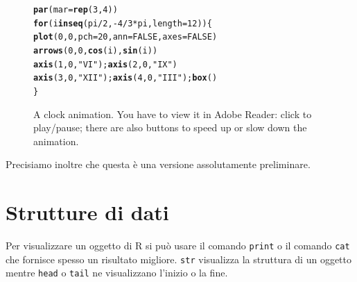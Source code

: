 \documentclass[onecolumn,12pt]{book}\usepackage[]{graphicx}\usepackage[]{color}
\makeatletter
\newcommand{\hlnum}[1]{\textcolor[rgb]{0.686,0.059,0.569}{#1}}%
\newcommand{\hlstr}[1]{\textcolor[rgb]{0.192,0.494,0.8}{#1}}%
\newcommand{\hlopt}[1]{\textcolor[rgb]{0,0,0}{#1}}%
\newcommand{\hlstd}[1]{\textcolor[rgb]{0.345,0.345,0.345}{#1}}%
\newcommand{\hlkwa}[1]{\textcolor[rgb]{0.161,0.373,0.58}{\textbf{#1}}}%
\newcommand{\hlkwc}[1]{\textcolor[rgb]{0.333,0.667,0.333}{#1}}%
\newcommand{\hlkwd}[1]{\textcolor[rgb]{0.737,0.353,0.396}{\textbf{#1}}}%
\newenvironment{kframe}{%
 \def\at@end@of@kframe{}%
 \ifinner\ifhmode%
  \def\at@end@of@kframe{\end{minipage}}%
  \begin{minipage}{\columnwidth}%
 \fi\fi%
 \def\FrameCommand##1{\hskip\@totalleftmargin \hskip-\fboxsep
 \colorbox{shadecolor}{##1}\hskip-\fboxsep
     \hskip-\linewidth \hskip-\@totalleftmargin \hskip\columnwidth}%
 \MakeFramed {\advance\hsize-\width
   \@totalleftmargin\z@ \linewidth\hsize
   \@setminipage}}%
 {\par\unskip\endMakeFramed%
 \at@end@of@kframe}
\newenvironment{knitrout}{}{} %
\makeatother
\begin{document}
\begin{figure}
\begin{knitrout}
\color{fgcolor}\begin{kframe}
\begin{alltt}
\hlkwd{par}\hlstd{(}\hlkwc{mar} \hlstd{=} \hlkwd{rep}\hlstd{(}\hlnum{3}\hlstd{,} \hlnum{4}\hlstd{))}
\hlkwa{for} \hlstd{(i} \hlkwa{in} \hlkwd{seq}\hlstd{(pi}\hlopt{/}\hlnum{2}\hlstd{,} \hlopt{-}\hlnum{4}\hlopt{/}\hlnum{3} \hlopt{*} \hlstd{pi,} \hlkwc{length} \hlstd{=} \hlnum{12}\hlstd{)) \{}
    \hlkwd{plot}\hlstd{(}\hlnum{0}\hlstd{,} \hlnum{0}\hlstd{,} \hlkwc{pch} \hlstd{=} \hlnum{20}\hlstd{,} \hlkwc{ann} \hlstd{=} \hlnum{FALSE}\hlstd{,} \hlkwc{axes} \hlstd{=} \hlnum{FALSE}\hlstd{)}
    \hlkwd{arrows}\hlstd{(}\hlnum{0}\hlstd{,} \hlnum{0}\hlstd{,} \hlkwd{cos}\hlstd{(i),} \hlkwd{sin}\hlstd{(i))}
    \hlkwd{axis}\hlstd{(}\hlnum{1}\hlstd{,} \hlnum{0}\hlstd{,} \hlstr{"VI"}\hlstd{);} \hlkwd{axis}\hlstd{(}\hlnum{2}\hlstd{,} \hlnum{0}\hlstd{,} \hlstr{"IX"}\hlstd{)}
    \hlkwd{axis}\hlstd{(}\hlnum{3}\hlstd{,} \hlnum{0}\hlstd{,} \hlstr{"XII"}\hlstd{);} \hlkwd{axis}\hlstd{(}\hlnum{4}\hlstd{,} \hlnum{0}\hlstd{,} \hlstr{"III"}\hlstd{);} \hlkwd{box}\hlstd{()}
\hlstd{\}}
\end{alltt}
\end{kframe}












\end{knitrout}

\caption{A clock animation. You have to view it in Adobe Reader: click to play/pause;
there are also buttons to speed up or slow down the animation.\label{fig:clock-animation}}
\end{figure}

Precisiamo inoltre che questa \`e una versione assolutamente preliminare.
\chapter{Strutture di dati}

 
Per visualizzare un oggetto di \textsf{R} si pu\`o usare il comando \texttt{print} o il comando \texttt{cat} che fornisce spesso un risultato migliore. \texttt{str} visualizza la struttura di un oggetto mentre \texttt{head} o \texttt{tail} ne visualizzano l'inizio o la fine.
\end{document}
